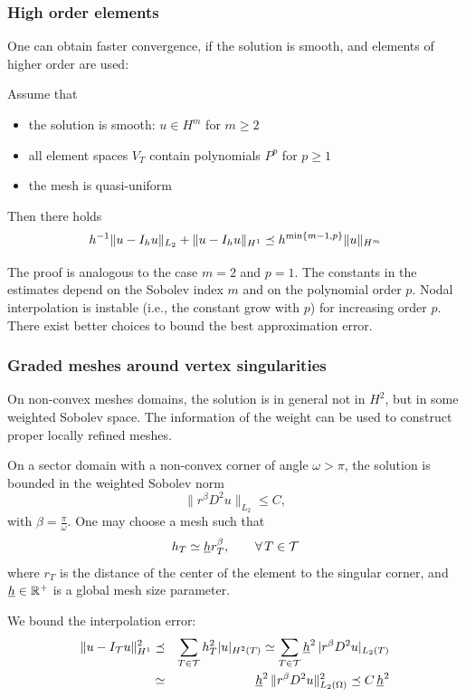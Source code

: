 \subsubsection{High order elements}

One can obtain faster convergence, if the solution is smooth, and elements of higher
order are used:
\begin{theorem} Assume that
\begin{itemize}
\item the solution is smooth: $u \in H^m$ for $m \geq 2$ 
\item all element spaces $V_T$ contain polynomials $P^p$ for $p \geq 1$
\item the mesh is quasi-uniform
\end{itemize}
Then there holds
$$
h^{-1} \| u - I_h u \|_{L_2} + \| u  - I_h u \|_{H^1} \preceq h^{\min\{ m-1,p\} } \| u \|_{H^m}
$$
\end{theorem}

The proof is analogous to the case $m=2$ and $p=1$. The constants in
the estimates depend on the Sobolev index $m$ and on the polynomial
order $p$. Nodal interpolation is instable (i.e., the constant grow
with $p$) for increasing order $p$. There exist better choices to
bound the best approximation error.



\subsubsection{Graded meshes around vertex singularities}

On non-convex meshes domains, the solution is in general not in $H^2$, but
in some weighted Sobolev space. The information of the weight can be used to
construct proper locally refined meshes.

On a sector domain with a non-convex corner of angle $\omega > \pi$, the
solution is bounded in the weighted Sobolev norm
$$
\| r^\beta D^2 u \|_{L_2} \leq C,
$$
with $\beta = \frac{\pi}{\omega}$. One may choose a mesh such that
$$
h_T \simeq \underline h r_T^\beta, \qquad \forall \, T \in {\cal T}
$$
where $r_T$ is the distance of the center of the element to the singular
corner, and $\underline h \in {\mathbb R}^+$ is a global mesh size parameter.


We bound the interpolation error:
\begin{eqnarray*}
\| u - I_{\cal T} u \|_{H^1}^2 & \preceq &
\sum_{T \in \cal T} h_T^2 | u |_{H^2(T)} \simeq
\sum_{T \in \cal T} \underline h^2 \, | r^\beta D^2 u |_{L_2(T)} \\
& \simeq & \underline h^2 \, \| r^\beta D^2 u \|_{L_2(\Omega)}^2
\preceq C \, \underline h^2
\end{eqnarray*}


